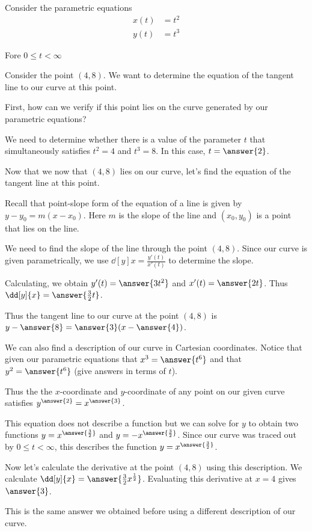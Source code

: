 \documentclass{ximera}
\author{Jason Miller}
\begin{document}
\begin{exercise}
Consider the parametric equations 
\begin{align*}
x(t) &= t^2\\
y(t) &= t^3
\end{align*}

Fore $0\leq t < \infty$


Consider the point $(4,8)$. We want to determine the equation of the tangent line to our curve at this point. 

First, how can we verify if this point lies on the curve generated by our parametric equations? 

We need to determine whether there is a value of the parameter $t$
that simultaneously satisfies $t^2=4$ and $t^3=8$. 
In this case, $t=\answer{2}$. 

Now that we now that $(4,8)$ lies on our curve, let's find the equation of the tangent line at this point. 

Recall that point-slope form of the equation of a line is given by $y-y_{0}=m(x-x_{0})$. Here $m$ is the slope of the line and $(x_{0}, y_{0})$ is a point that lies on the line. 

We need to find the slope of the line through the point $(4,8)$. Since our curve is given parametrically, we use $\dd[y]{x}=\frac{y'(t)}{x'(t)}$ to determine the slope. 

Calculating, we obtain $y'(t)=\answer{3t^2}$ and $x'(t)=\answer{2t}$. Thus $\dd[y]{x}=\answer{\frac{3}{2}t}$. 

Thus the tangent line to our curve at the point $(4, 8)$ is $y-\answer{8}=\answer{3}(x-\answer{4})$. 

\begin{exercise}

We can also find a description of our curve in Cartesian coordinates. Notice that given our parametric equations that $x^3=\answer{t^6}$ and that $y^2=\answer{t^6}$ (give answers in terms of $t$).

Thus the the $x$-coordinate and $y$-coordinate of any point on our given curve satisfies $y^{\answer{2}}=x^{\answer{3}}$. 

This equation does not describe a function but we can solve for $y$ to obtain two functions $y=x^{\answer{\frac{3}{2}}}$ and $y=-x^{\answer{\frac{3}{2}}}$. Since our curve was traced out by $0\leq t < \infty$, this describes the function $y=x^{\answer{\frac{3}{2}}}$. 

Now let's calculate the derivative at the point $(4,8)$ using this description. We calculate $\dd[y]{x}=\answer{\frac{3}{2}x^{\frac{1}{2}}}$. 
Evaluating this derivative at $x=4$ gives $\answer{3}$.

This is the same answer we obtained before using a different description of our curve. 

\end{exercise}
\end{exercise}
\end{document}
